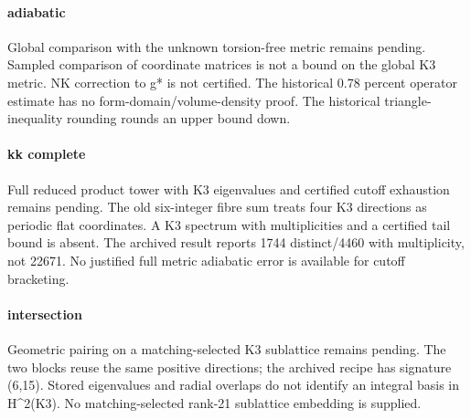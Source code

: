 \paragraph{adiabatic} Global comparison with the unknown torsion-free metric remains pending. Sampled comparison of coordinate matrices is not a bound on the global K3 metric. NK correction to g* is not certified. The historical 0.78 percent operator estimate has no form-domain/volume-density proof. The historical triangle-inequality rounding rounds an upper bound down.

\paragraph{kk complete} Full reduced product tower with K3 eigenvalues and certified cutoff exhaustion remains pending. The old six-integer fibre sum treats four K3 directions as periodic flat coordinates. A K3 spectrum with multiplicities and a certified tail bound is absent. The archived result reports 1744 distinct/4460 with multiplicity, not 22671. No justified full metric adiabatic error is available for cutoff bracketing.

\paragraph{intersection} Geometric pairing on a matching-selected K3 sublattice remains pending. The two blocks reuse the same positive directions; the archived recipe has signature (6,15). Stored eigenvalues and radial overlaps do not identify an integral basis in H\textasciicircum{}2(K3). No matching-selected rank-21 sublattice embedding is supplied.
